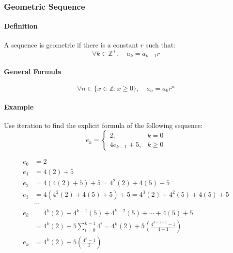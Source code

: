 \subsubsection*{Geometric Sequence}
\paragraph*{Definition}
A sequence is geometric if there is a constant $r$ such that:
\begin{equation*}
    \forall k \in \mathbb{Z}^+, \quad  a_k = a_{k-1}r
\end{equation*}
\paragraph*{General Formula}
\begin{equation*}
    \forall n \in \{x \in \mathbb{Z} : x \geq 0\}, \quad a_n = a_0 r^n
\end{equation*}

\paragraph*{Example}
Use iteration to find the explicit formula of the following sequence:
\begin{equation*}
    e_k = 
    \begin{cases}
        2, & k = 0\\
        4e_{k-1} + 5, & k \geq 0
    \end{cases}
\end{equation*}

\begin{align*}
    e_0 &= 2\\
    e_1 &= 4(2) + 5\\
    e_2 &= 4(4(2) + 5) + 5 = 4^2(2) + 4(5) + 5\\
    e_3 &= 4(4^2(2) + 4(5) + 5) + 5 = 4^3(2) + 4^2(5) + 4(5) + 5\\
    &\cdots\\
    e_k &= 4^k(2) + 4^{k-1}(5) + 4^{k-2}(5) + \cdots + 4(5) + 5\\
    &= 4^k(2) + 5 \sum_{i=0}^{k-1} 4^i = 4^k(2) + 5 (\frac{4^{k-1+1} - 1}{4 - 1})\\
    e_k &= 4^k(2) + 5 (\frac{4^{k} - 1}{3})\\
\end{align*}


